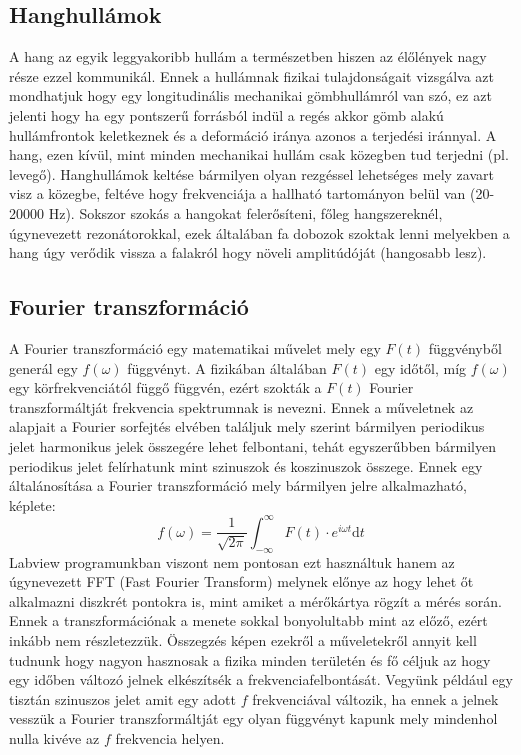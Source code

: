\documentclass[a4paper,12pt]{article}
\newcommand{\D}{\mathrm{d}}
\begin{document}
\subsection{Hanghullámok}
A hang az egyik leggyakoribb hullám a természetben hiszen az élőlények nagy része ezzel kommunikál. Ennek a hullámnak fizikai tulajdonságait vizsgálva azt mondhatjuk hogy egy longitudinális mechanikai gömbhullámról van szó, ez azt jelenti hogy ha egy pontszerű forrásból indül a regés akkor gömb alakú hullámfrontok keletkeznek és a deformáció iránya azonos a terjedési iránnyal. A hang, ezen kívül, mint minden mechanikai hullám csak közegben tud terjedni (pl. levegő). Hanghullámok keltése bármilyen olyan rezgéssel lehetséges mely zavart visz a közegbe, feltéve hogy frekvenciája a hallható tartományon belül van (20-20000 Hz). Sokszor szokás a hangokat felerősíteni, főleg hangszereknél, úgynevezett rezonátorokkal, ezek általában fa dobozok szoktak lenni melyekben a hang úgy verődik vissza a falakról hogy növeli amplitúdóját (hangosabb lesz).

\subsection{Fourier transzformáció}

A Fourier transzformáció egy matematikai művelet mely egy $F(t)$ függvényből generál egy $f(\omega)$ függvényt. A fizikában általában $F(t)$ egy időtől, míg $f(\omega)$ egy körfrekvenciától függő függvén, ezért szokták a $F(t)$ Fourier transzformáltját frekvencia spektrumnak is nevezni. Ennek a műveletnek az alapjait a Fourier sorfejtés elvében találjuk mely szerint bármilyen periodikus jelet harmonikus jelek összegére lehet felbontani, tehát egyszerűbben bármilyen periodikus jelet felírhatunk mint szinuszok és koszinuszok összege. Ennek egy általánosítása a Fourier transzformáció mely bármilyen jelre alkalmazható, képlete:
\begin{equation}
f(\omega) = \dfrac{1}{\sqrt{2\pi}} \int^{\infty}_{-\infty} F(t) \cdot e^{i \omega t} \D t
\end{equation}
Labview programunkban viszont nem pontosan ezt használtuk hanem az úgynevezett FFT (Fast Fourier Transform) melynek előnye az hogy lehet őt alkalmazni diszkrét pontokra is, mint amiket a mérőkártya rögzít a mérés során. Ennek a transzformációnak a menete sokkal bonyolultabb mint az előző, ezért inkább nem részletezzük. Összegzés képen ezekről a műveletekről annyit kell tudnunk hogy nagyon hasznosak a fizika minden területén és fő céljuk az hogy egy időben változó jelnek elkészítsék a frekvenciafelbontását. Vegyünk például egy tisztán szinuszos jelet amit egy adott $f$ frekvenciával változik, ha ennek a jelnek vesszük a Fourier transzformáltját egy olyan függvényt kapunk mely mindenhol nulla kivéve az $f$ frekvencia helyen.
\end{document}
